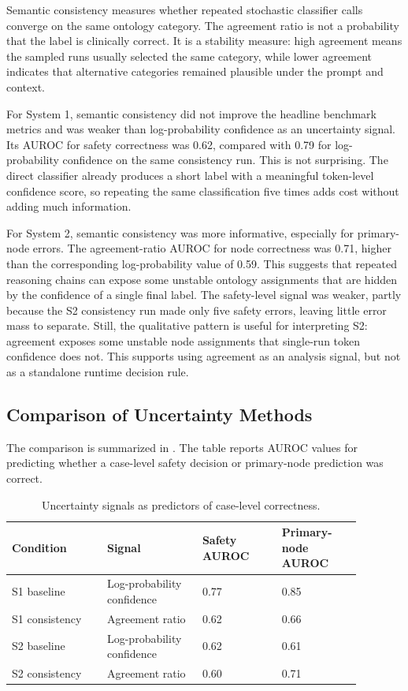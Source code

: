 Semantic consistency measures whether repeated stochastic classifier calls converge on
the same ontology category. The agreement ratio is not a probability that the label is
clinically correct. It is a stability measure: high agreement means the sampled runs
usually selected the same category, while lower agreement indicates that alternative
categories remained plausible under the prompt and context.

For System 1, semantic consistency did not improve the headline benchmark metrics and
was weaker than log-probability confidence as an uncertainty signal. Its AUROC for
safety correctness was 0.62, compared with 0.79 for log-probability confidence on the
same consistency run. This is not surprising. The direct classifier already produces a
short label with a meaningful token-level confidence score, so repeating the same
classification five times adds cost without adding much information.

For System 2, semantic consistency was more informative, especially for primary-node
errors. The agreement-ratio AUROC for node correctness was 0.71, higher than the
corresponding log-probability value of 0.59. This suggests that repeated reasoning
chains can expose some unstable ontology assignments that are hidden by the confidence
of a single final label. The safety-level signal was weaker, partly because the S2
consistency run made only five safety errors, leaving little error mass to separate.
Still, the qualitative pattern is useful for interpreting S2: agreement exposes some
unstable node assignments that single-run token confidence does not. This supports
using agreement as an analysis signal, but not as a standalone runtime decision rule.

\subsection{Comparison of Uncertainty Methods}

The comparison is summarized in . The table reports
AUROC values for predicting whether a case-level safety decision or primary-node
prediction was correct.

\begin{table}
  \centering
  \caption{Uncertainty signals as predictors of case-level correctness.}
  \label{tab:uncertainty-comparison}
  \small
  \setlength{\tabcolsep}{5pt}
  \renewcommand{\arraystretch}{1.16}
  \begin{tabular}{p{0.24\linewidth}p{0.24\linewidth}p{0.20\linewidth}p{0.20\linewidth}}
    \toprule
    Condition & Signal & Safety AUROC & Primary-node AUROC \\
    \midrule
    S1 baseline & Log-probability confidence & 0.77 & 0.85 \\
    S1 consistency & Agreement ratio & 0.62 & 0.66 \\
    S2 baseline & Log-probability confidence & 0.62 & 0.61 \\
    S2 consistency & Agreement ratio & 0.60 & 0.71 \\
    \bottomrule
  \end{tabular}
\end{table}

